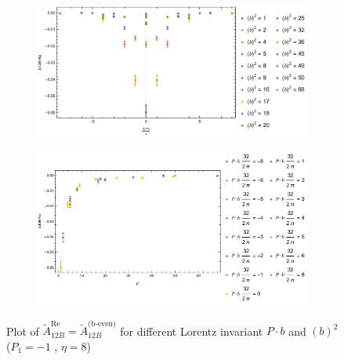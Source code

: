 \documentclass[]{article}
\numberwithin{equation}{section}
\newcommand{\tAmp}{\widetilde{A}}
\newcommand{\tAmp}{\ensuremath{\widetilde{A}^{(+)}}}
\begin{document}
\begin{figure}[h!]
     \centering
     \begin{subfigure}[b]{0.45\textwidth}
         \centering
         \includegraphics[width=\textwidth]{Amp_plots/bP_A12B_b_even_P1_-1_eta_8.pdf}
     \end{subfigure}
     \begin{subfigure}[b]{0.45\textwidth}
         \centering
         \includegraphics[width=\textwidth]{Amp_plots/bsq_A12B_b_even_P1_-1_eta_8.pdf}
     \end{subfigure}
        \caption{Plot of $\tAmp^{\text{Re}}_{12B}=\tAmp^{\text{(b-even)}}_{12B}$ for different Lorentz invariant $P\cdot b$ and $(b)^2$  ($P_{1} = -1$ , $\eta=8$)}
\end{figure}
\end{document}
